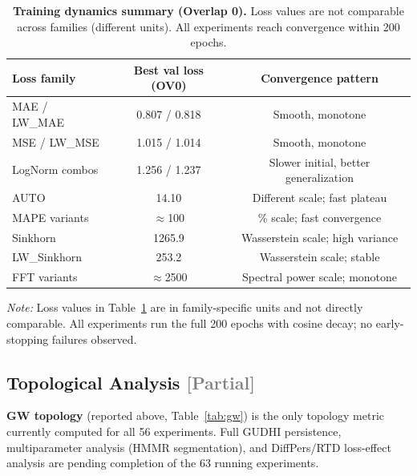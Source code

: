 \begin{table}[h]
\centering\small
\begin{tabular}{lcc}
\hline
\textbf{Loss family} & \textbf{Best val loss (OV0)} & \textbf{Convergence pattern} \\
\hline
MAE / LW\_MAE  & 0.807 / 0.818 & Smooth, monotone \\
MSE / LW\_MSE  & 1.015 / 1.014 & Smooth, monotone \\
LogNorm combos & 1.256 / 1.237 & Slower initial, better generalization \\
AUTO           & 14.10          & Different scale; fast plateau \\
MAPE variants  & $\approx$100   & \% scale; fast convergence \\
Sinkhorn       & 1265.9         & Wasserstein scale; high variance \\
LW\_Sinkhorn   & 253.2          & Wasserstein scale; stable \\
FFT variants   & $\approx$2500  & Spectral power scale; monotone \\
\hline
\end{tabular}
\caption{\textbf{Training dynamics summary (Overlap 0).} Loss values are not comparable across families (different units). All experiments reach convergence within 200 epochs.}
\label{tab:dynamics}
\end{table}

\textit{Note:} Loss values in Table~\ref{tab:dynamics} are in family-specific units and not directly comparable. All experiments run the full 200 epochs with cosine decay; no early-stopping failures observed.

\subsection{Topological Analysis \textcolor{gray}{[Partial]}}

\textbf{GW topology} (reported above, Table~\ref{tab:gw}) is the only topology metric currently computed for all 56 experiments. Full GUDHI persistence, multiparameter analysis (HMMR segmentation), and DiffPers/RTD loss-effect analysis are pending completion of the 63 running experiments.

